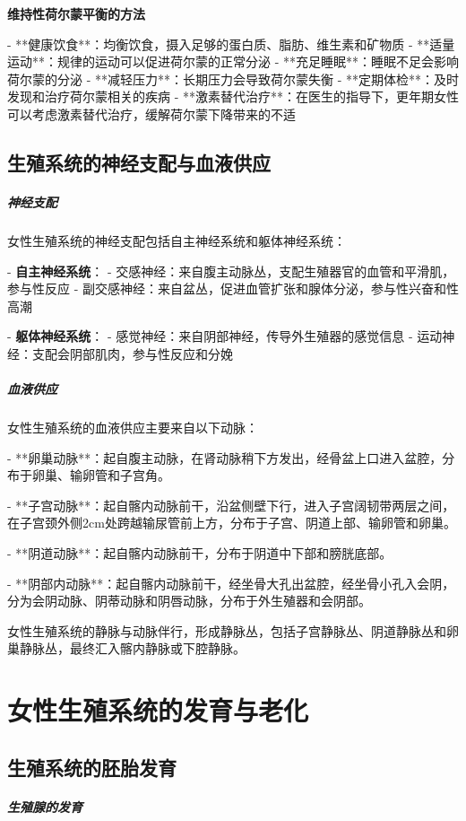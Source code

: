 \begin{enumerate}
\textbf{维持性荷尔蒙平衡的方法}

- **健康饮食**：均衡饮食，摄入足够的蛋白质、脂肪、维生素和矿物质
- **适量运动**：规律的运动可以促进荷尔蒙的正常分泌
- **充足睡眠**：睡眠不足会影响荷尔蒙的分泌
- **减轻压力**：长期压力会导致荷尔蒙失衡
- **定期体检**：及时发现和治疗荷尔蒙相关的疾病
- **激素替代治疗**：在医生的指导下，更年期女性可以考虑激素替代治疗，缓解荷尔蒙下降带来的不适

\subsection{生殖系统的神经支配与血液供应}

\subparagraph{神经支配}

女性生殖系统的神经支配包括自主神经系统和躯体神经系统：

- \textbf{自主神经系统}：
  - 交感神经：来自腹主动脉丛，支配生殖器官的血管和平滑肌，参与性反应
  - 副交感神经：来自盆丛，促进血管扩张和腺体分泌，参与性兴奋和性高潮

- \textbf{躯体神经系统}：
  - 感觉神经：来自阴部神经，传导外生殖器的感觉信息
  - 运动神经：支配会阴部肌肉，参与性反应和分娩

\subparagraph{血液供应}

女性生殖系统的血液供应主要来自以下动脉：

- **卵巢动脉**：起自腹主动脉，在肾动脉稍下方发出，经骨盆上口进入盆腔，分布于卵巢、输卵管和子宫角。

- **子宫动脉**：起自髂内动脉前干，沿盆侧壁下行，进入子宫阔韧带两层之间，在子宫颈外侧2cm处跨越输尿管前上方，分布于子宫、阴道上部、输卵管和卵巢。

- **阴道动脉**：起自髂内动脉前干，分布于阴道中下部和膀胱底部。

- **阴部内动脉**：起自髂内动脉前干，经坐骨大孔出盆腔，经坐骨小孔入会阴，分为会阴动脉、阴蒂动脉和阴唇动脉，分布于外生殖器和会阴部。

女性生殖系统的静脉与动脉伴行，形成静脉丛，包括子宫静脉丛、阴道静脉丛和卵巢静脉丛，最终汇入髂内静脉或下腔静脉。

\section{女性生殖系统的发育与老化}

\subsection{生殖系统的胚胎发育}

\subparagraph{生殖腺的发育}


\end{enumerate}
